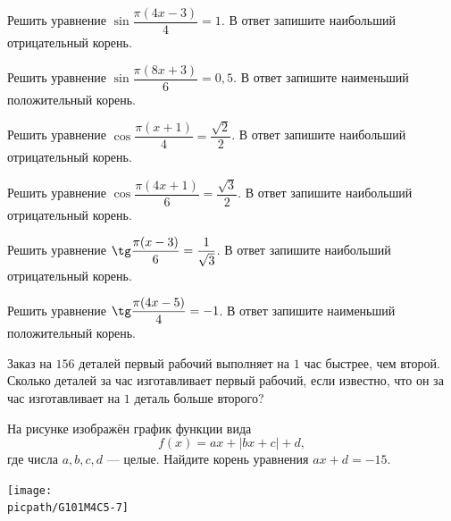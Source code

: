 \begin{homework}[number=2]
	\begin{listofex}
		\item Решить уравнение \( \sin\dfrac{\pi(4x-3)}{4}=1 \). В ответ запишите наибольший отрицательный корень.
		\item Решить уравнение \( \sin\dfrac{\pi(8x+3)}{6}=0,5 \). В ответ запишите наименьший положительный корень.
		\item Решить уравнение \( \cos\dfrac{\pi(x+1)}{4}=\dfrac{\sqrt{2}}{2} \). В ответ запишите наибольший отрицательный корень.
		\item Решить уравнение \( \cos\dfrac{\pi(4x+1)}{6}=\dfrac{\sqrt{3}}{2} \). В ответ запишите наибольший отрицательный корень.
		\item Решить уравнение \( \tg\dfrac{\pi(x-3)}{6}=\dfrac{1}{\sqrt{3}} \). В ответ запишите наибольший отрицательный корень.
		\item Решить уравнение \( \tg\dfrac{\pi(4x-5)}{4}=-1 \). В ответ запишите наименьший положительный корень.
		\item Заказ на \(156\) деталей первый рабочий выполняет на \(1\) час быстрее, чем второй. Сколько деталей за час изготавливает первый рабочий, если известно, что он за час изготавливает на \(1\) деталь больше второго?
		\item
		\begin{minipage}[t]{\bodywidth}
			На рисунке изображён график функции вида \[ f(x)=ax+|bx+c|+d, \] где числа \(a, b, c, d\) --- целые. Найдите корень уравнения \(ax+d=-15\).
		\end{minipage}
		\hspace{0.02\linewidth}
		\begin{minipage}[t]{\picwidth}
			\texttt{[image: \\picpath/G101M4C5-7]}
		\end{minipage}
	\end{listofex}
\end{homework}

